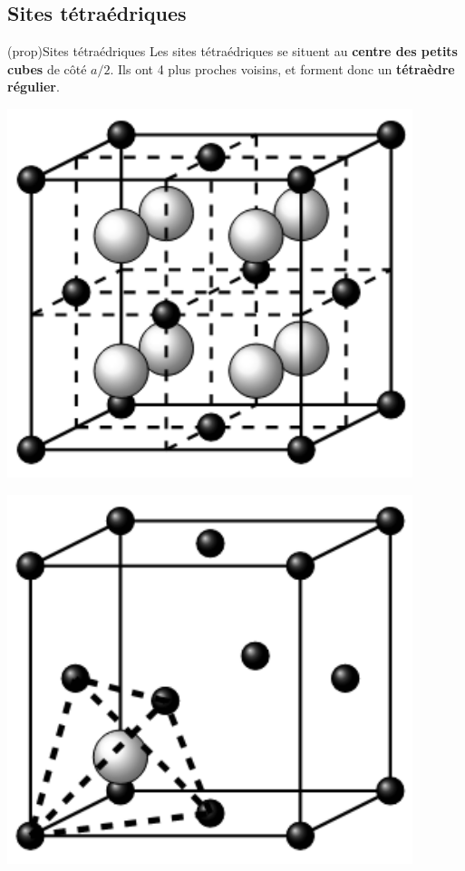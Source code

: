 \documentclass[../../main/main.tex]{subfiles}
\begin{document}
\subsection{Sites tétraédriques}
\begin{tcb*}(prop){Sites tétraédriques}
	Les sites tétraédriques se situent au \textbf{centre des petits cubes} de côté
	$a/2$. Ils ont 4 plus proches voisins, et forment donc un \textbf{tétraèdre
		régulier}.
	\smallbreak
	\begin{isd}
		\begin{center}
			\includegraphics[scale=1]{sites_T-8.png}
		\end{center}
		\tcblower
		\begin{center}
			\includegraphics[scale=1]{sites_T-1.png}
		\end{center}
	\end{isd}
\end{tcb*}
\end{document}
